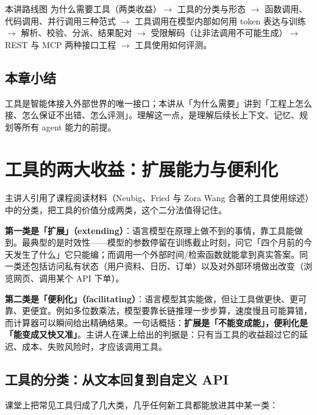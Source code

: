 \documentclass[a4paper]{article}
\begin{document}
\begin{knowledgebox}{本讲路线图}
为什么需要工具（两类收益）$\rightarrow$ 工具的分类与形态 $\rightarrow$ 函数调用、代码调用、并行调用三种范式 $\rightarrow$ 工具调用在模型内部如何用 token 表达与训练 $\rightarrow$ 解析、校验、分派、结果配对 $\rightarrow$ 受限解码（让非法调用不可能生成）$\rightarrow$ REST 与 MCP 两种接口工程 $\rightarrow$ 工具使用如何评测。
\end{knowledgebox}

\subsection{本章小结}
工具是智能体接入外部世界的唯一接口；本讲从「为什么需要」讲到「工程上怎么接、怎么保证不出错、怎么评测」。理解这一点，是理解后续长上下文、记忆、规划等所有 agent 能力的前提。

\section{工具的两大收益：扩展能力与便利化}

主讲人引用了课程阅读材料（Neubig、Fried 与 Zora Wang 合著的工具使用综述）中的分类，把工具的价值分成两类，这个二分法值得记住。

\textbf{第一类是「扩展」（extending）}：语言模型在原理上做不到的事情，靠工具能做到。最典型的是时效性——模型的参数停留在训练截止时刻，问它「四个月前的今天发生了什么」它只能编；而调用一个外部时间/检索函数就能拿到真实答案。同一类还包括访问私有状态（用户资料、日历、订单）以及对外部环境做出改变（浏览网页、调用某个 API 下单）。

\textbf{第二类是「便利化」（facilitating）}：语言模型其实能做，但让工具做更快、更可靠、更便宜。例如多位数乘法，模型要靠长链推理一步步算，速度慢且可能算错，而计算器可以瞬间给出精确结果。一句话概括：\textbf{扩展是「不能变成能」，便利化是「能变成又快又准」}。主讲人在课上给出的判据是：只有当工具的收益超过它的延迟、成本、失败风险时，才应该调用工具。

\subsection{工具的分类：从文本回复到自定义 API}

课堂上把常见工具归成了几大类，几乎任何新工具都能放进其中某一类：
\end{document}
